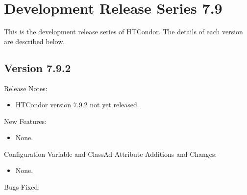 
\section{\label{sec:History-7-9}Development Release Series 7.9}

This is the development release series of HTCondor.
The details of each version are described below.

\subsection*{\label{sec:New-7-9-2}Version 7.9.2}

\noindent Release Notes:

\begin{itemize}

\item HTCondor version 7.9.2 not yet released.

\end{itemize}


\noindent New Features:

\begin{itemize}

\item None.

\end{itemize}

\noindent Configuration Variable and ClassAd Attribute Additions and Changes:

\begin{itemize}

\item None.

\end{itemize}

\noindent Bugs Fixed:

